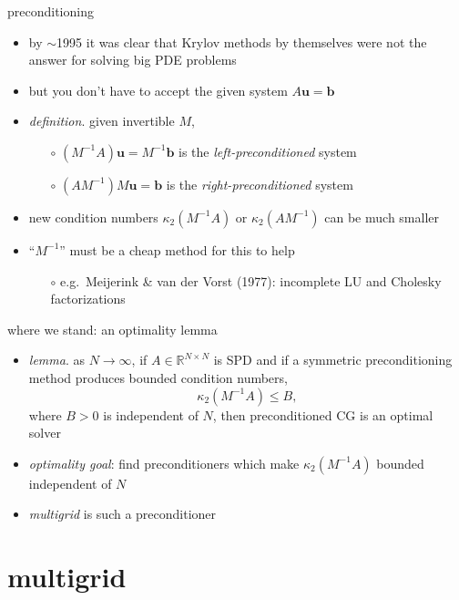 \documentclass[hide notes,intlimits,usenames,dvipsnames]{beamer}
\newcommand{\RR}{\mathbb{R}}
\newcommand{\bb}{\mathbf{b}}
\newcommand{\bu}{\mathbf{u}}
\begin{document}
\begin{frame}{preconditioning}
\begin{itemize}
\item by $\sim$1995 it was clear that Krylov methods by themselves were not the answer for solving big PDE problems
\item but you don't have to accept the given system $A\bu=\bb$
\item \emph{definition}. given invertible $M$,
	\begin{itemize}
	\item[$\circ$] $(M^{-1}A)\bu=M^{-1}\bb$ is the \emph{left-preconditioned} system
	\item[$\circ$] $(AM^{-1})M\bu=\bb$ is the \emph{right-preconditioned} system
	\end{itemize}
\item new condition numbers $\kappa_2(M^{-1}A)$ or $\kappa_2(AM^{-1})$ can be much smaller
\item ``$M^{-1}$'' must be a cheap method for this to help
	\begin{itemize}
	\item[$\circ$] e.g.~Meijerink \& van der Vorst (1977): incomplete LU and Cholesky factorizations
	\end{itemize}
\end{itemize}
\end{frame}


\begin{frame}{where we stand: an optimality lemma}


\begin{itemize}
\item \emph{lemma}.  as $N\to\infty$, if $A\in\RR^{N\times N}$ is SPD and if a symmetric preconditioning method produces bounded condition numbers,
     $$\kappa_2(M^{-1}A) \le B,$$
where $B>0$ is independent of $N$, then preconditioned CG is an optimal solver

\vspace{5mm}
\item \emph{optimality goal}:  find preconditioners which make $\kappa_2(M^{-1}A)$ bounded independent of $N$

\bigskip
\item \emph{multigrid} is such a preconditioner
\end{itemize}
\end{frame}


\section{multigrid}
\end{document}
